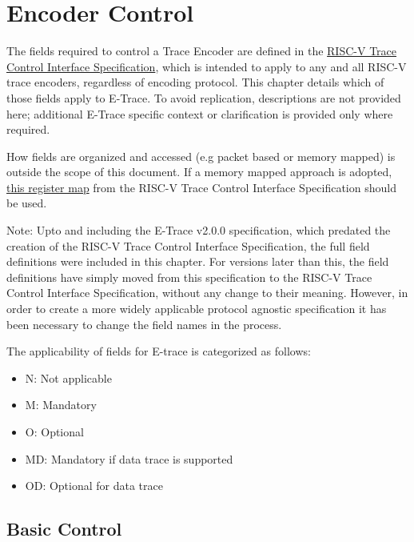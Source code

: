 \chapter{Encoder Control} \label{encoderControl}

The fields required to control a Trace Encoder are defined in the 
\href{https://github.com/riscv-non-isa/tg-nexus-trace/blob/master/docs/RISC-V-Trace-Control-Interface.adoc}{RISC-V Trace Control Interface Specification},
which is intended to apply to any and all RISC-V trace encoders, regardless of encoding protocol.
This chapter details which of those fields apply to E-Trace.  To avoid replication, descriptions are not provided here; 
additional E-Trace specific context or clarification is provided only where required.

How fields are organized and accessed (e.g packet based or memory mapped) is outside the scope of this document.  
If a memory mapped approach is adopted, \href{https://github.com/riscv-non-isa/tg-nexus-trace/blob/master/docs/RISC-V-Trace-Control-Interface.adoc\#register-map}
{this register map} from the RISC-V Trace Control Interface Specification should be used.

Note: Upto and including the E-Trace v2.0.0 specification, which predated
the creation of the RISC-V Trace Control Interface Specification, the full field definitions 
were included in this chapter.  For versions later than this, the field definitions have simply moved from this
specification to the RISC-V Trace Control Interface Specification, without any change to their meaning.  However, in order to 
create a more widely applicable protocol agnostic specification it has been necessary to change the field names in the 
process.

The applicability of fields for E-trace is categorized as follows:

\begin{itemize}
  \item N: Not applicable
  \item M: Mandatory
  \item O: Optional
  \item MD: Mandatory if data trace is supported
  \item OD: Optional for data trace
\end{itemize}

\FloatBarrier
\section{Basic Control} \label{sec:ctl-basic}

